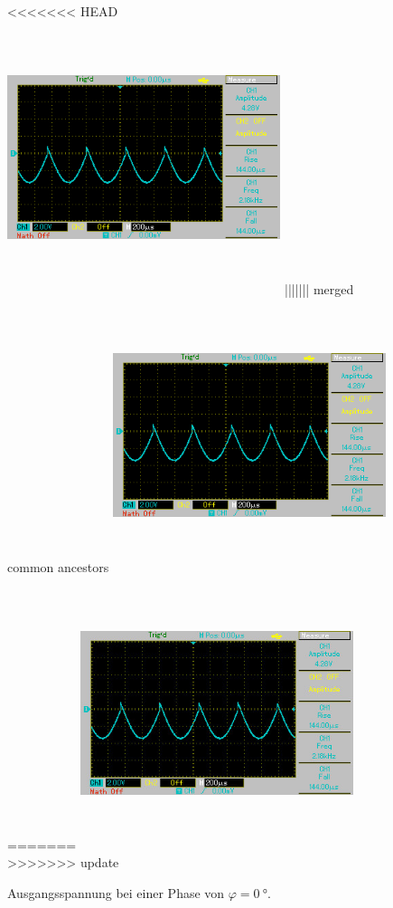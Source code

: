 \begin{figure}
    \centering
<<<<<<< HEAD
    \includegraphics[width=8cm, height=8cm]{build/1.BMP} %
||||||| merged common ancestors
    \includegraphics[width=8cm, height=8cm]{build/1.BMP}
=======
    \includegraphics[width=8cm, height=8cm]{build/1.jpg}
>>>>>>> update
    \caption{Ausgangsspannung bei einer Phase von $\varphi = \SI{0}{\degree}$.}
    \label{fig:bild1}
\end{figure}

